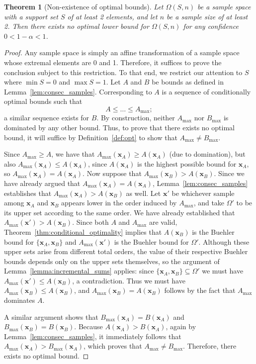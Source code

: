 \documentclass{article}
\newtheorem{theorem}{Theorem}[section]
\theoremstyle{definition}
\theoremstyle{remark}
\def\x{\mathbf{x}}
\begin{document}
\color{black}
\begin{theorem}[Non-existence of optimal bounds]
\label{thm:no_opt}
Let $\Omega(S,n)$ be a sample space with a support set $S$ of at least 2 elements, and let $n$ be a sample size of at least 2. Then there exists no optimal lower bound for $\Omega(S,n)$ for any confidence $0<1-\alpha<1$.
\end{theorem}

\begin{proof}
    Any sample space is simply an affine transformation of a sample space whose extremal elements are 0 and 1. Therefore, it suffices to prove the conclusion subject to this restriction. To that end, we restrict our attention to $S$ where $\min S = 0$ and $\max S = 1$. Let $A$ and $B$ be bounds as defined in Lemma~\ref{lem:consec_samples}. Corresponding to $A$ is a sequence of conditionally optimal bounds such that 
    $$
    A \leq \ldots \leq A_{\max};
    $$
    a similar sequence exists for $B$. By construction, neither $A_{\max}$ nor $B_{\max}$ is dominated by any other bound. Thus, to prove that there exists no optimal bound, it will suffice by Definition~\ref{def:opt} to show that $A_{\max} \neq B_{\max}$.

    Since $A_{\max} \geq A$, we have that $A_{\max}(\x_A) \geq A(\x_A)$ (due to domination), but also $A_{\max}(\x_A) \leq A(\x_A)$, since $A(\x_A)$ is the highest possible bound for $\x_A$, so $A_{\max}(\x_A)=A(\x_A)$. Now suppose that $A_{\max}(\x_B) > A(\x_B)$. Since we have already argued that $A_{\max}(\x_A)=A(\x_A)$, Lemma~\ref{lem:consec_samples} establishes that $A_{\max}(\x_A) > A(\x_B)$ as well. Let $\x'$ be whichever sample among $\x_A$ and $\x_B$ appears lower in the order induced by $A_{\max}$, and take $\Omega'$ to be its upper set according to the same order. We have already established that $A_{\max}(\x') > A(\x_B)$. Since both $A$ and $A_{\max}$ are valid, Theorem~\ref{thm:conditional_optimality} implies that $A(\x_B)$ is the Buehler bound for $\{\x_A, \x_B\}$ and $A_{\max}(\x')$ is the Buehler bound for $\Omega'$.
    Although these upper sets arise from different total orders, the value of their respective Buehler bounds depends only on the upper sets themselves, so the argument of Lemma~\ref{lemma:incremental_sums} applies: since $\{\x_A, \x_B\} \subseteq \Omega'$ we must have $A_{\max}(\x') \leq A(\x_B)$, a contradiction. Thus we must have $A_{\max}(\x_B) \leq A(\x_B)$, and $A_{\max}(\x_B) = A(\x_B)$ follows by the fact that $A_{\max}$ dominates $A$.
    
    A similar argument shows that $B_{\max}(\x_A) = B(\x_A)$ and $B_{\max}(\x_B) = B(\x_B)$. Because $A(\x_A) > B(\x_A)$, again by Lemma~\ref{lem:consec_samples}, it immediately follows that $A_{\max}(\x_A) > B_{\max}(\x_A)$, which proves that $A_{\max} \neq B_{\max}$. Therefore, there exists no optimal bound.
\end{proof}
\color{black}
\end{document}
